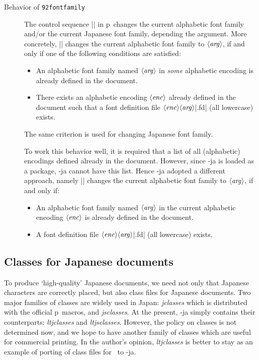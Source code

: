 \documentclass{ajt}
\begin{document}
\begin{description}

\item[Behavior of\/ {\tt\char92fontfamily\/}]
The control sequence |\fontfamily| in p\LaTeXe\ changes the current alphabetic
	   font family and/or the current Japanese font family,
	   depending the argument. More concretely,
	   || changes the
	   current alphabetic font family to $\langle\hbox{\it
	   arg\/}\rangle$, if and only if one of the following
	   conditions are satisfied:
\begin{itemize}
\item An alphabetic font family named $\langle\hbox{\it arg\/}\rangle$ in
      \emph{some} alphabetic encoding is already defined in the document.
\item There exists an alphabetic encoding $\langle\hbox{\it
      enc\/}\rangle$ already defined in the document such that a font
      definition file $\langle\hbox{\it enc\/}\rangle\langle\hbox{\it
      arg\/}\rangle$|.fd| (all lowercase) exists.
\end{itemize}
The same criterion is used for changing Japanese font family.

To work this behavior well, it is required that a list of all (alphabetic) encodings defined
	   already in the document. However, since \LuaTeX-ja
	   is loaded as a package, \LuaTeX-ja cannot have this list.
	   Hence \LuaTeX-ja adopted a different approach, namely
	   || changes the
	   current alphabetic font family to $\langle\hbox{\it
	   arg\/}\rangle$, if and only if:
\begin{itemize}
\item An alphabetic font family named $\langle\hbox{\it arg\/}\rangle$
      in the current alphabetic encoding $\langle\hbox{\it
      enc\/}\rangle$ is already defined in the document.
\item A  font definition file $\langle\hbox{\it enc\/}\rangle\langle\hbox{\it
      arg\/}\rangle$|.fd| (all lowercase) exists.
\end{itemize}


\end{description}



\subsection{Classes for Japanese documents}
To produce `high-quality' Japanese documents, we need not only that
Japanese characters are correctly placed, but also class files for
Japanese documents. Two major families of classes are widely used in Japan:
\emph{jclasses} which is distributed with the official p\LaTeXe\ macros,
and \emph{jsclasses}.  At the present, \LuaTeX-ja
simply contains their counterparts: \emph{ltjclasses} and
\emph{ltjsclasses}. However, the policy on classes is not determined
now, and we hope to have another family of classes which are useful for
commercial printing.  In the author's opinion, \emph{ltjclasses} is
better to stay as an example of porting of class files for \pTeX\ to
\LuaTeX-ja.
\end{document}
